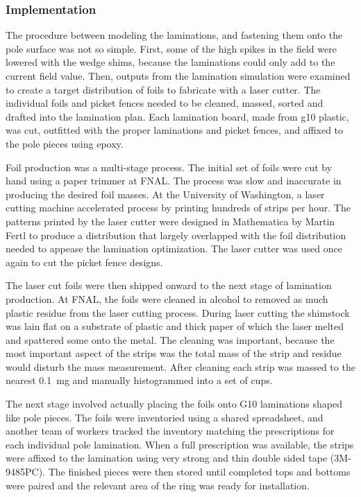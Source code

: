 \subsubsection{Implementation}

The procedure between modeling the laminations, and fastening them onto the pole surface was not so simple.  First, some of the high spikes in the field were lowered with the wedge shims, because the laminations could only add to the current field value.  Then, outputs from the lamination simulation were examined to create a target distribution of foils to fabricate with a laser cutter.  The individual foils and picket fences needed to be cleaned, massed, sorted and drafted into the lamination plan.  Each lamination board, made from g10 plastic, was cut, outfitted with the proper laminations and picket fences, and affixed to the pole pieces using epoxy.


Foil production was a multi-stage process.  The initial set of foils were cut by hand using a paper trimmer at FNAL.  The process was slow and inaccurate in producing the desired foil masses.  At the University of Washington, a laser cutting machine accelerated process by printing hundreds of strips per hour.  The patterns printed by the laser cutter were designed in Mathematica by Martin Fertl to produce a distribution that largely overlapped with the foil distribution needed to appease the lamination optimization.  The laser cutter was used once again to cut the picket fence designs.  


The laser cut foils were then shipped onward to the next stage of lamination production.  At FNAL, the foils were cleaned in alcohol to removed as much plastic residue from the laser cutting process.  During laser cutting the shimstock was lain flat on a substrate of plastic and thick paper of which the laser melted and spattered some onto the metal.  The cleaning was important, because the most important aspect of the strips was the total mass of the strip and residue would disturb the mass measurement.  After cleaning each strip was massed to the nearest \SI{0.1}{\milli\gram} and manually histogrammed into a set of cups.


The next stage involved actually placing the foils onto G10 laminations shaped like pole pieces.  The foils were inventoried using a shared spreadsheet, and another team of workers tracked the inventory matching the prescriptions for each individual pole lamination.  When a full prescription was available, the strips were affixed to the lamination using very strong and thin double sided tape (3M-9485PC).  The finished pieces were then stored until completed tops and bottoms were paired and the relevant area of the ring was ready for installation.


